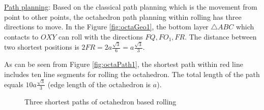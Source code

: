\noindent\uline{Path planning}:
Based on the classical path planning which is the movement from point to other points, the octahedron path planning within rolling has three directions to move. In the Figure \ref{fig:octaGeo1}, the bottom layer $\triangle ABC$ which contacts to $OXY$ can roll with the directions $FQ, FO_1, FR$. The distance between two shortest positions is $2FR= 2a\frac{\sqrt{3}}{6}=a\frac{\sqrt{3}}{3}$. 

\noindent As can be seen from Figure \ref{fig:octaPath1}, the shortest path within red line includes ten line segments for rolling the octahedron. The total length of the path equals $10a\frac{\sqrt{3}}{3}$ (edge length of the octahedron is $a$).

\begin{figure}[h!]
\hfill
{}
\caption{Three shortest paths of octahedron based rolling}
\label{fig:octaPaths}
\end{figure}


